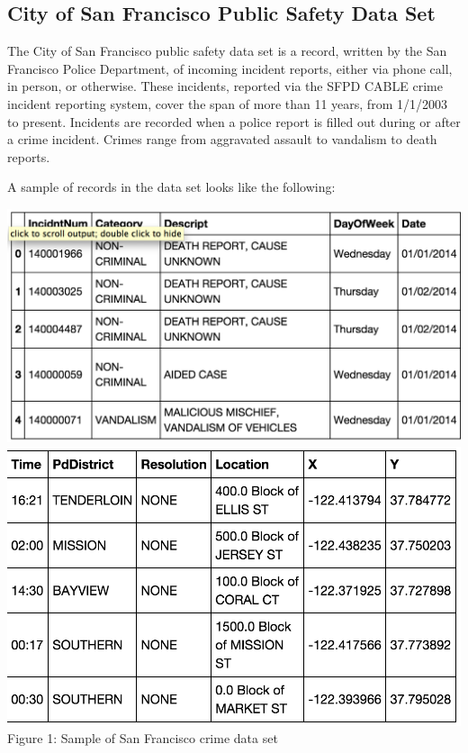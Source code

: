 \documentclass{article}
\begin{document}
\subsection{City of San Francisco Public Safety Data Set}

The City of San Francisco public safety data set is a record, written by
the San Francisco Police Department, of incoming incident reports, either
via phone call, in person, or otherwise. These incidents, reported via the
SFPD CABLE crime incident reporting system, cover the span of more than 11
years, from 1/1/2003 to present. Incidents are recorded when a police
report is filled out during or after a crime incident. Crimes range from
aggravated assault to vandalism to death reports.

A sample of records in the data set looks like the following:

\begin{center}
  \includegraphics[scale=0.5]{sf_city_sample_1.png} \\
  \includegraphics[scale=0.5]{sf_city_sample_2.png} \\
  Figure 1: Sample of San Francisco crime data set
\end{center}
\end{document}
